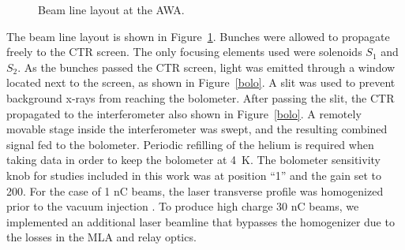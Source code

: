 \begin{figure}%
	\centering
	\begin{tikzpicture}[scale=0.8, text=black]
	
	\end{tikzpicture}	
	\caption{Beam line layout at the AWA.}
	\label{beamline}
\end{figure}
The beam line layout is shown in Figure~\ref{beamline}. 
Bunches were allowed to propagate freely to the 
CTR screen. The only focusing elements used were solenoids $S_1$ and
$S_2$. As the bunches passed the CTR screen, light was
emitted through a window located next to the screen, 
as shown in Figure~\ref{bolo}. A slit was used to prevent
background x-rays from reaching the bolometer.
After passing the slit, the CTR propagated to the 
interferometer also shown in Figure~\ref{bolo}.  %
A remotely movable stage inside the interferometer was swept, 
and the resulting combined signal fed to the bolometer. 
Periodic refilling of the helium is required when taking data in order
to keep the bolometer at \SI{4}{K}. The bolometer sensitivity knob for studies included in this work was at position ``1'' and
the gain set to 200.
For the case of 1 nC  beams, the laser transverse profile was homogenized prior to the vacuum injection \cite{PhysRevAccelBeams.20.103404}.
To produce high charge 30 nC beams, we implemented an additional laser beamline that bypasses the homogenizer due to the losses in the 
MLA and relay optics.  

